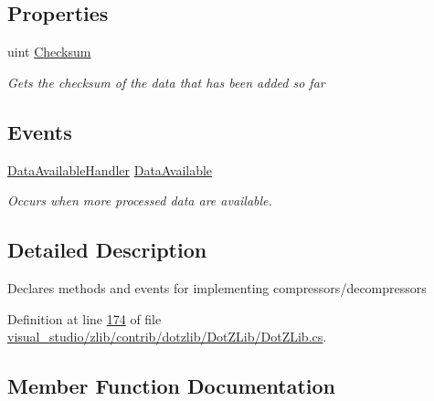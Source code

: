 \subsection*{Properties}
\begin{DoxyCompactItemize}
\item 
uint \hyperlink{interface_dot_z_lib_1_1_codec_ab5bdf7dd00f261c89c05a59a9cd7604b}{Checksum}
\begin{DoxyCompactList}\small\item\em Gets the checksum of the data that has been added so far \end{DoxyCompactList}\end{DoxyCompactItemize}
\subsection*{Events}
\begin{DoxyCompactItemize}
\item 
\hyperlink{namespace_dot_z_lib_a13a751b897fc2af0be2307e4deb7eb1c}{Data\+Available\+Handler} \hyperlink{interface_dot_z_lib_1_1_codec_a402ac1b984b22dc3ddae49f7e9e3cc33}{Data\+Available}
\begin{DoxyCompactList}\small\item\em Occurs when more processed data are available. \end{DoxyCompactList}\end{DoxyCompactItemize}


\subsection{Detailed Description}
Declares methods and events for implementing compressors/decompressors 



Definition at line \hyperlink{visual__studio_2zlib_2contrib_2dotzlib_2_dot_z_lib_2_dot_z_lib_8cs_source_l00174}{174} of file \hyperlink{visual__studio_2zlib_2contrib_2dotzlib_2_dot_z_lib_2_dot_z_lib_8cs_source}{visual\+\_\+studio/zlib/contrib/dotzlib/\+Dot\+Z\+Lib/\+Dot\+Z\+Lib.\+cs}.



\subsection{Member Function Documentation}
\mbox{\label{interface_dot_z_lib_1_1_codec_aa40d0820bd95f098b3e7d8e707e7a536}} 
